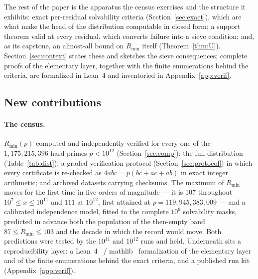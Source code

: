 \documentclass[11pt]{article}
\theoremstyle{plain}
\theoremstyle{remark}
\theoremstyle{plain}
\numberwithin{equation}{section}
\begin{document}
The rest of the paper is the apparatus the census exercises and the
structure it exhibits: exact per-residual solvability criteria
(Section~\ref{sec:exact}), which are what make the head of the
distribution computable in closed form; a support theorem valid at
every residual, which converts failure into a sieve condition; and,
as its capstone, an almost-all bound on $R_{\min}$ itself
(Theorem~\ref{thm:U}). Section~\ref{sec:context} states these and
sketches the sieve consequences; complete proofs of the elementary
layer, together with the finite enumerations behind the criteria,
are formalized in Lean~4 and inventoried in
Appendix~\ref{app:verif}.

\subsection*{New contributions}

\paragraph*{The census.} $R_{\min}(p)$ computed and independently
verified for every one of the $1{,}175{,}215{,}396$ hard primes
$p < 10^{12}$ (Section~\ref{sec:comp}): the full distribution
(Table~\ref{tab:dist}); a graded verification protocol
(Section~\ref{sec:protocol}) in which every certificate is re-checked
as $4abc = p(bc+ac+ab)$ in exact integer arithmetic; and archived
datasets carrying checksums. The maximum of $R_{\min}$ moves for the
first time in five orders of magnitude --- it is $107$ throughout
$10^7 \le x \le 10^{11}$ and $111$ at $10^{12}$, first attained at
$p = 119{,}945{,}383{,}009$ --- and a calibrated independence model,
fitted to the complete $10^9$ solvability masks, predicted in advance
both the population of the then-empty band $87 \le R_{\min} \le 103$
and the decade in which the record would move. Both predictions were
tested by the $10^{11}$ and $10^{12}$ runs and held. Underneath sits a
reproducibility layer: a Lean~4~\cite{Lean4} /
\mbox{mathlib}~\cite{mathlib} formalization of the elementary layer
and of the finite enumerations behind the exact criteria, and a
published run kit (Appendix~\ref{app:verif}).
\end{document}
